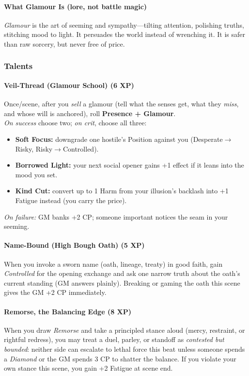 \paragraph{What Glamour Is (lore, not battle magic)}
\emph{Glamour} is the art of seeming and sympathy—tilting attention, polishing truths, stitching mood to light. It persuades the world instead of wrenching it. It is safer than raw sorcery, but never free of price.

\subsubsection{Talents}
\paragraph{Veil-Thread (Glamour School) \normalfont(6 XP)}
Once/scene, after you \emph{sell} a glamour (tell what the senses get, what they \emph{miss}, and whose will is anchored), roll \textbf{Presence + Glamour}.\\
\emph{On success} choose two; \emph{on crit}, choose all three:
\begin{itemize}
  \item \textbf{Soft Focus:} downgrade one hostile’s Position against you (Desperate$\rightarrow$Risky, Risky$\rightarrow$Controlled).
  \item \textbf{Borrowed Light:} your next social opener gains +1 effect if it leans into the mood you set.
  \item \textbf{Kind Cut:} convert up to 1 Harm from your illusion’s backlash into +1 Fatigue instead (you carry the price).
\end{itemize}
\emph{On failure:} GM banks +2 CP; someone important notices the seam in your seeming.

\paragraph{Name-Bound (High Bough Oath) \normalfont(5 XP)}
When you invoke a sworn name (oath, lineage, treaty) in good faith, gain \emph{Controlled} for the opening exchange and ask one narrow truth about the oath’s current standing (GM answers plainly). Breaking or gaming the oath this scene gives the GM +2 CP immediately.

\paragraph{Remorse, the Balancing Edge \normalfont(8 XP)}
When you draw \emph{Remorse} and take a principled stance aloud (mercy, restraint, or rightful redress), you may treat a duel, parley, or standoff as \emph{contested but bounded}: neither side can escalate to lethal force this beat unless someone spends a \emph{Diamond} or the GM spends 3 CP to shatter the balance. If you violate your own stance this scene, you gain +2 Fatigue at scene end.

